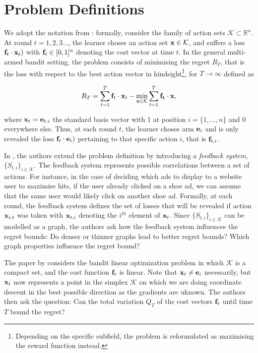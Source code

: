 \section{Problem Definitions}
We adopt the notation from \citep{alon, hazan}: formally, consider the family of action sets $\mathcal{K}\subset \mathbb{R}^n$. At round $t=1,2,3...$, the learner choses an action set ${\bf x}\in \mathcal{K}$, and suffers a loss ${\bf f}_t\cdot{\bf x}_t)$ with ${\bf f}_t\in [0,1]^n$ denoting the cost vector at time $t$. In the general multi-armed bandit setting, the problem consists of minimising the regret $R_T$, that is the loss with respect to the best action vector in hindsight\footnote{Depending on the specific subfield, the problem is reformulated as maximising the reward function instead.}, for $T\to\infty$ defined as

\begin{align}
	R_T=\sum_{t=1}^T{\bf f}_t\cdot{\bf x}_t-\min_{{\bf x}\in \mathcal{K}}\sum_{t=1}^T {\bf f_t}\cdot{\bf x},
\end{align}

where ${\bf x}_t={\bf e}_{t,i}$ the standard basis vector with 1 at position $i=\{1,...,n\}$ and $0$ everywhere else. Thus, at each round $t$, the learner choses arm ${\bf e}_i$ and is only revealed the loss ${\bf f}_t\cdot{\bf e}_i)$ pertaining to that specific action $i$, that is ${\bf f}_{t,i}$.  

In \citep{alon}, the authors extend the problem definition by introducing a \textit{feedback system}, $\{S_{t,i}\}_{i\in \mathcal{K}}$. The feedback system represents possible correlations between a set of actions. For instance, in the case of deciding which ads to display to a website user to maximise hits, if the user already clicked on a shoe ad, we can assume that the same user would likely click on another shoe ad. Formally, at each round, the feedback system defines the set of losses that will be revealed if action ${\bf x}_{i,t}$ was taken with ${\bf x}_{t,i}$ denoting the $i^{th}$ element of ${\bf x}_t$. Since $\{S_{t,i}\}_{i\in \mathcal{K}}$ can be modelled as a graph, the authors ask how the feedback system influences the regret bounds: Do denser or thinner graphs lead to better regret bounds? Which graph properties influence the regret bound? 

The paper by \citep{bertsimas} considers the bandit linear optimization problem in which $\mathcal{K}$ is a compact set, and the cost function ${\bf f}_t$ is linear. Note that ${\bf x}_t\not={\bf e}_i$ necessarily, but ${\bf x}_t$ now represents a point in the simplex $\mathcal{K}$ on which we are doing coordinate descent in the best possible direction as the gradients are uknown. The authors then ask the question: Can the total variation $Q_T$ of the cost vectors ${\bf f}_t$ until time $T$ bound the regret?

